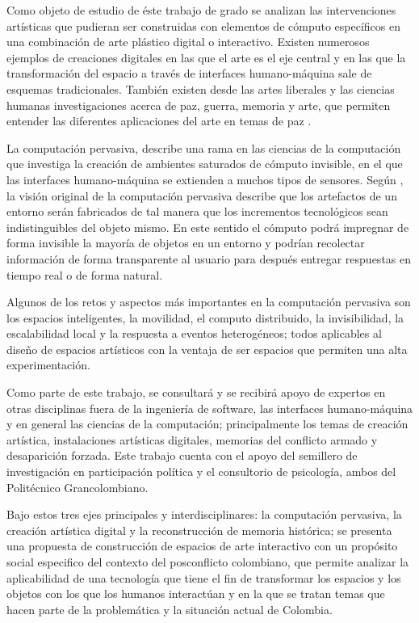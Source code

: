 Como objeto de estudio de éste trabajo de grado se analizan las intervenciones artísticas que pudieran ser construidas con elementos de cómputo específicos en una combinación de arte plástico digital o interactivo. Existen numerosos ejemplos
\cite{RN35,RN25,RN34,RN38,RN31,RN29,RN40,RN37}
de creaciones digitales en las que el arte es el eje central y en las que la transformación del espacio a través de interfaces humano-máquina sale de esquemas tradicionales. También existen desde las artes liberales y las ciencias humanas investigaciones acerca de paz, guerra, memoria y arte, que permiten entender las diferentes aplicaciones del arte en temas de paz \cite{Jimenez201672,SotoAguilar201591,EstripeautBourjac2013154}.

La computación pervasiva, describe una rama en las ciencias de la computación que investiga la creación de ambientes saturados de cómputo invisible, en el que las interfaces humano-máquina se extienden a muchos tipos de sensores. Según \cite{RN1}, la visión original de la computación pervasiva describe que los artefactos de un entorno serán fabricados de tal manera que los incrementos tecnológicos sean indistinguibles del objeto mismo. En este sentido el cómputo podrá impregnar de forma invisible la mayoría de objetos en un entorno y podrían recolectar información de forma transparente al usuario para después entregar respuestas en tiempo real o de forma natural.

Algunos de los retos y aspectos más importantes en la computación pervasiva son los espacios inteligentes, la movilidad, el computo distribuido, la invisibilidad, la escalabilidad local y la respuesta a eventos heterogéneos; todos aplicables al diseño de espacios artísticos con la ventaja de ser espacios que permiten una alta experimentación.

Como parte de este trabajo, se consultará y se recibirá apoyo de expertos en otras disciplinas fuera de la ingeniería de software, las interfaces humano-máquina y en general las ciencias de la computación; principalmente los temas de creación artística, instalaciones artísticas digitales, memorias del conflicto armado y desaparición forzada. Este trabajo cuenta con el apoyo del semillero de investigación en participación política y el consultorio de psicología, ambos del Politécnico Grancolombiano.

Bajo estos tres ejes principales y interdisciplinares: la computación pervasiva, la creación artística digital y la reconstrucción de memoria histórica; se presenta una propuesta de construcción de espacios de arte interactivo con un propósito social especifico del contexto del posconflicto colombiano, que permite analizar la aplicabilidad de una tecnología que tiene el fin de transformar los espacios y los objetos con los que los humanos interactúan y en la que se tratan temas que hacen parte de la problemática y la situación actual de Colombia.

